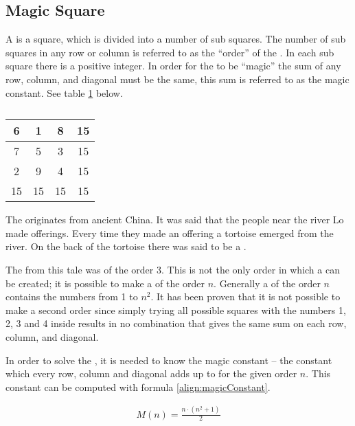 \subsection{Magic Square}
\label{sec:magicSquare}
A \msquare{} is a square, which is divided into a number of sub squares. The number of sub squares in any row or column is referred to as the ``order'' of the \msquare{}. In each sub square there is a positive integer. In order for the \msquare{} to be ``magic'' the sum of any row, column, and diagonal must be the same, this sum is referred to as the magic constant. See table \ref{tab:magicSquareOrder3} below.

\renewcommand{\arraystretch}{1.3}
\begin{table}[h]
	\centering
		\begin{tabular}{|c|c|c |@{\vrules}| c|}
			\hline
			6&1&8&15 \\
			\hline
			7&5&3&15 \\
			\hline
			2&9&4&15 \\
			\noalign{\hrules}
			15&15&15&15 \\
			\hline
		\end{tabular}
	\caption{}
	\label{tab:magicSquareOrder3}
\end{table}

The \msquare{} \cite{aiden06} originates from ancient China. It was said that the people near the river Lo made offerings. Every time they made an offering a tortoise emerged from the river. On the back of the tortoise there was said to be a \msquare{}.

The \msquare{} from this tale was of the order 3. This is not the only order in which a \msquare{} can be created; it is possible to make a \msquare{} of the order $n$. Generally a \msquare{} of the order $n$ contains the numbers from 1 to $n^2$. It has been proven that it is not possible to make a second order \msquare{} since simply trying all possible squares with the numbers 1, 2, 3 and 4 inside results in no combination that gives the same sum on each row, column, and diagonal.

In order to solve the \msquare{}, it is needed to know the magic constant -- the constant which every row, column and diagonal adds up to for the given order $n$. This constant can be computed with formula \ref{align:magicConstant}.

\begin{align}
\label{align:magicConstant}
	M(n) = \frac{n \cdot (n^2+1)}{2}
\end{align}

